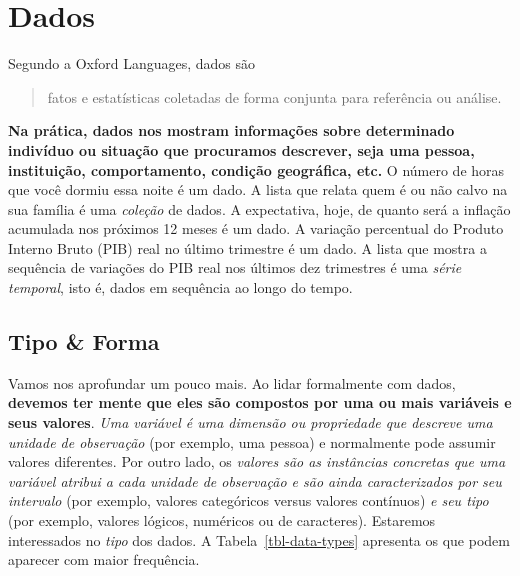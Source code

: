 \documentclass[
  letterpaper,
  DIV=11,
  numbers=noendperiod]{scrreprt}
\begin{document}
\section{Dados}\label{dados}

Segundo a Oxford Languages, dados são

\begin{quote}
fatos e estatísticas coletadas de forma conjunta para referência ou
análise.
\end{quote}

\textbf{Na prática, dados nos mostram informações sobre determinado
indivíduo ou situação que procuramos descrever, seja uma pessoa,
instituição, comportamento, condição geográfica, etc.} O número de horas
que você dormiu essa noite é um dado. A lista que relata quem é ou não
calvo na sua família é uma \emph{coleção} de dados. A expectativa, hoje,
de quanto será a inflação acumulada nos próximos 12 meses é um dado. A
variação percentual do Produto Interno Bruto (PIB) real no último
trimestre é um dado. A lista que mostra a sequência de variações do PIB
real nos últimos dez trimestres é uma \emph{série temporal}, isto é,
dados em sequência ao longo do tempo.

\subsection{Tipo \& Forma}\label{tipo-forma}

Vamos nos aprofundar um pouco mais. Ao lidar formalmente com dados,
\textbf{devemos ter mente que eles são compostos por uma ou mais
variáveis e seus valores}. \emph{Uma variável é uma dimensão ou
propriedade que descreve uma unidade de observação} (por exemplo, uma
pessoa) e normalmente pode assumir valores diferentes. Por outro lado,
os \emph{valores são as instâncias concretas que uma variável atribui a
cada unidade de observação e são ainda caracterizados por seu intervalo}
(por exemplo, valores categóricos versus valores contínuos) \emph{e seu
tipo} (por exemplo, valores lógicos, numéricos ou de caracteres).
Estaremos interessados no \emph{tipo} dos dados. A
Tabela~\ref{tbl-data-types} apresenta os que podem aparecer com maior
frequência.
\end{document}
